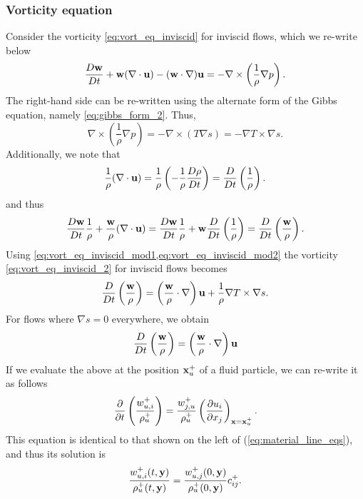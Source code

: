 \documentclass[oneside,a4paper,11pt]{report}
\begin{document}
\subsubsection{Vorticity equation}
Consider the vorticity \cref{eq:vort_eq_inviscid} for inviscid flows, which we re-write below
\begin{equation}
\label{eq:vort_eq_inviscid_2}
\frac{D \mathbf{w}}{D t} +  \mathbf{w}(\nabla \cdot \mathbf{u}) - (\mathbf{w} \cdot \nabla) \mathbf{u} = -\nabla \times \left ( \frac{1}{\rho} \nabla p \right).
\end{equation}
The right-hand side can be re-written using the alternate form of the Gibbs equation, namely \cref{eq:gibbs_form_2}. Thus,
\begin{equation}
\label{eq:vort_eq_inviscid_mod1}
    \nabla \times \left (\frac{1}{\rho} \nabla p \right) = -\nabla \times (T \nabla s) = -\nabla T \times \nabla s .
\end{equation}
Additionally, we note that
\begin{equation}
    \frac{1}{\rho} ( \nabla \cdot \mathbf{u}) = \frac{1}{\rho} \left ( -\frac{1}{\rho} \frac{D\rho}{Dt} \right ) = \frac{D}{Dt} \left (\frac{1}{\rho} \right ).
\end{equation}
and thus
\begin{equation}
\label{eq:vort_eq_inviscid_mod2}
    \frac{D\mathbf{w}}{Dt} \frac{1}{\rho} + \frac{\mathbf{w}}{\rho} (\nabla \cdot \mathbf{u}) = \frac{D\mathbf{w}}{Dt} \frac{1}{\rho} + \mathbf{w} \frac{D}{Dt} \left (\frac{1}{\rho} \right ) = \frac{D}{Dt} \left (\frac{\mathbf{w}}{\rho} \right).
\end{equation}
Using \cref{eq:vort_eq_inviscid_mod1,eq:vort_eq_inviscid_mod2} the vorticity \cref{eq:vort_eq_inviscid_2} for inviscid flows becomes
\begin{equation}
\frac{D}{Dt} \left (\frac{\mathbf{w}}{\rho} \right ) = \left( \frac{\mathbf{w}}{\rho} \cdot \nabla \right) \mathbf{u} + \frac{1}{\rho} \nabla T \times \nabla s.
\end{equation}
For flows where $\nabla s = 0$ everywhere, we obtain
\begin{equation}
\frac{D}{Dt} \left (\frac{\mathbf{w}}{\rho} \right ) = \left( \frac{\mathbf{w}}{\rho} \cdot \nabla \right) \mathbf{u}
\end{equation}
If we evaluate the above at the position $\mathbf{x}^+_u$ of a fluid particle, we can re-write it as follows
\begin{equation}
\frac{\partial}{\partial t} \left ( \frac{w^+_{u,i}}{\rho^+_u} \right ) = \frac{w^+_{j,u}}{\rho^+_u} \left ( \frac{\partial u_i}{\partial x_j} \right )_{\mathbf{x} = \mathbf{x}^+_u}.
\end{equation}
This equation is identical to that shown on the left of (\ref{eq:material_line_eqs}), and thus its solution is 
\begin{equation}
\frac{w^+_{u,i}(t,\mathbf{y})}{\rho^+_u(t,\mathbf{y})} = \frac{w^+_{u,j}(0,\mathbf{y})}{\rho^+_u(0,\mathbf{y})} c^+_{ij}.
\end{equation}
\end{document}
